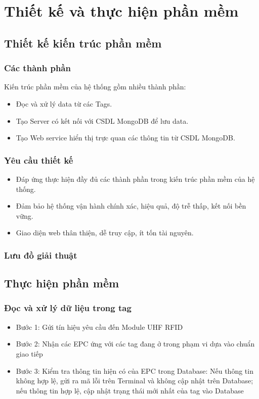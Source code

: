 \headerandfooterconfig

\chapter{Thiết kế và thực hiện phần mềm}

\section{Thiết kế kiến trúc phần mềm}
\subsection{Các thành phần}
Kiến trúc phần mềm của hệ thống gồm nhiều thành phần:
\begin{itemize}
	\item Đọc và xử lý data từ các Tags.
	\item Tạo Server có kết nối với CSDL MongoDB để lưu data.
	\item Tạo Web service hiển thị trực quan các thông tin từ CSDL MongoDB.
\end{itemize}
\subsection{Yêu cầu thiết kế}
\begin{itemize}
	\item Đáp ứng thực hiện đầy đủ các thành phần trong kiến trúc phần mềm của hệ thống.
	\item Đảm bảo hệ thống vận hành chính xác, hiệu quả, độ trễ thấp, kết nối bền vững.
	\item Giao diện web thân thiện, dễ truy cập, ít tốn tài nguyên.
\end{itemize}
\subsection{Lưu đồ giải thuật}
\label{ref{fig4_11}}
\section{Thực hiện phần mềm}
\subsection{Đọc và xử lý dữ liệu trong tag}
\begin{itemize}
	\item Bước 1: Gửi tín hiệu yêu cầu đến Module UHF RFID
	\item Bước 2: Nhận các EPC ứng với các tag đang ở trong phạm vi dựa vào chuẩn giao tiếp
	\item Bước 3: Kiểm tra thông tin hiện có của EPC trong Database: Nếu thông tin không hợp lệ, gửi ra mã lỗi trên Terminal và không cập nhật trên Database; nếu thông tin hợp lệ, cập nhật trạng thái mới nhất của tag vào Database
\end{itemize}
